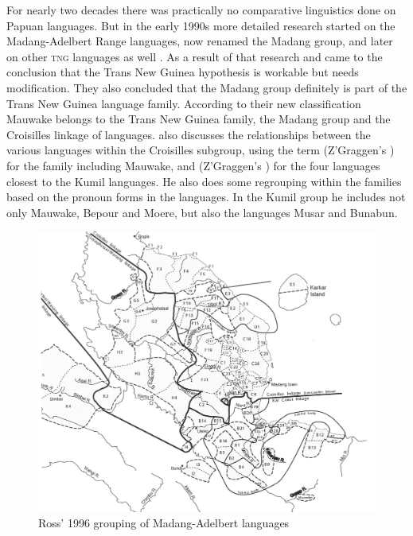 For nearly two decades there was practically no comparative linguistics done on Papuan languages.  But in the early 1990s more detailed research started on the Madang-Adelbert Range languages, now renamed the Madang group, and later on other \textsc{tng} languages as well \citep{Pawley1998}. As a result of that research \citet{Pawley1995, Pawley2001} and \citet{Ross1995} came to the conclusion that the Trans New Guinea hypothesis is workable but needs modification. They also concluded that the Madang group definitely is part of the Trans New Guinea language family. According to their new classification Mauwake belongs to the Trans New Guinea family, the Madang group and the Croisilles linkage of languages. \citet[21--25]{Ross1996} also discusses the relationships between the various languages within the Croisilles subgroup, using the term  (Z'Graggen's   ) for the family including Mauwake, and  (Z'Graggen's  ) for the four languages closest to the Kumil languages. He also does some regrouping within the families based on the pronoun  forms in the languages.  In the Kumil group he includes not only Mauwake, Bepour and Moere, but also the languages Musar and Bunabun. 



\begin{figure}
\caption{Ross' 1996 grouping of Madang-Adelbert languages \citep[Map~4]{Ross1996}}
\label{map:4:MadangRoss}
\includegraphics[width=\textwidth]{figures/1-ross_grouping_of_Madang_Adelbert_languages_map.jpeg}
\end{figure}


